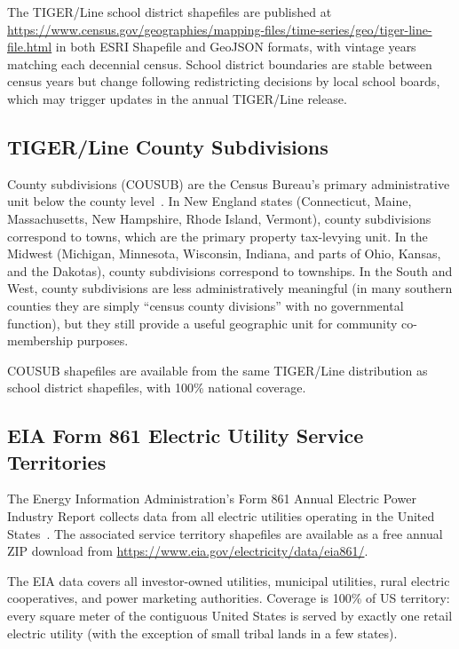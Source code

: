 The TIGER/Line school district shapefiles are published at
\url{https://www.census.gov/geographies/mapping-files/time-series/geo/tiger-line-file.html}
in both ESRI Shapefile and GeoJSON formats, with vintage years matching each decennial
census.
School district boundaries are stable between census years but change following
redistricting decisions by local school boards, which may trigger updates in the
annual TIGER/Line release.

\subsection{TIGER/Line County Subdivisions}

County subdivisions (COUSUB) are the Census Bureau's primary administrative unit
below the county level~\citep{census2020tiger}.
In New England states (Connecticut, Maine, Massachusetts, New Hampshire, Rhode Island,
Vermont), county subdivisions correspond to towns, which are the primary property
tax-levying unit.
In the Midwest (Michigan, Minnesota, Wisconsin, Indiana, and parts of Ohio, Kansas,
and the Dakotas), county subdivisions correspond to townships.
In the South and West, county subdivisions are less administratively meaningful (in
many southern counties they are simply ``census county divisions'' with no governmental
function), but they still provide a useful geographic unit for community co-membership
purposes.

COUSUB shapefiles are available from the same TIGER/Line distribution as school
district shapefiles, with 100\% national coverage.

\subsection{EIA Form 861 Electric Utility Service Territories}

The Energy Information Administration's Form 861 Annual Electric Power Industry Report
collects data from all electric utilities operating in the United States~\citep{eia861}.
The associated service territory shapefiles are available as a free annual ZIP
download from \url{https://www.eia.gov/electricity/data/eia861/}.

The EIA data covers all investor-owned utilities, municipal utilities, rural electric
cooperatives, and power marketing authorities.
Coverage is 100\% of US territory: every square meter of the contiguous United States
is served by exactly one retail electric utility (with the exception of small tribal
lands in a few states).

